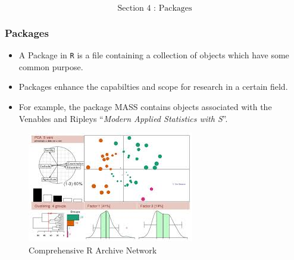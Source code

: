 \documentclass{beamer}
\begin{document}
 	\begin{frame}
 		\Huge
 		\[\mbox{ Section 4 : Packages } \]
 	\end{frame}
 	\begin{frame}
 		\frametitle{Packages}
 		
 		\begin{itemize}
 			\item A Package in \texttt{R} is a file containing a collection of objects which have some common purpose.
 			\item Packages enhance the capabilties and scope for research in a certain field. 
 			\item For example, the
 			package MASS contains objects associated with the Venables and Ripleys ``\textit{Modern Applied
 				Statistics with S}”. 
 		\end{itemize}
 		
 	\end{frame}
 	\begin{frame}
 		
 		
 		\begin{figure}
 			\centering
 			\includegraphics[width=0.97\linewidth]{CRAN}
 			\caption{Comprehensive R Archive Network}
 			
 		\end{figure}
 		
 		
 	\end{frame}
 	
\end{document}
